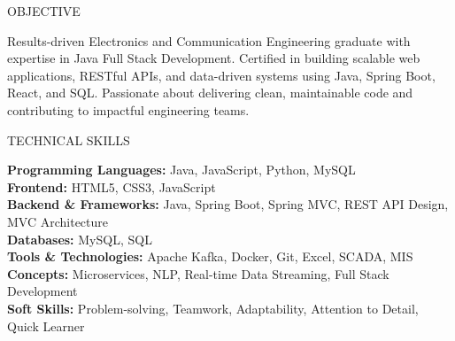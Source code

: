 \documentclass{resume}
\begin{document}

\begin{rSection}{OBJECTIVE}

Results-driven Electronics and Communication Engineering graduate with expertise in Java Full Stack Development. Certified in building scalable web applications, RESTful APIs, and data-driven systems using Java, Spring Boot, React, and SQL. Passionate about delivering clean, maintainable code and contributing to impactful engineering teams.

\end{rSection}


\begin{rSection}{TECHNICAL SKILLS}

\textbf{Programming Languages:} Java, JavaScript, Python, MySQL \\
\textbf{Frontend:} HTML5, CSS3, JavaScript \\
\textbf{Backend \& Frameworks:} Java, Spring Boot, Spring MVC, REST API Design, MVC Architecture \\
\textbf{Databases:} MySQL, SQL \\
\textbf{Tools \& Technologies:} Apache Kafka, Docker, Git, Excel, SCADA, MIS \\
\textbf{Concepts:} Microservices, NLP, Real-time Data Streaming, Full Stack Development \\
\textbf{Soft Skills:} Problem-solving, Teamwork, Adaptability, Attention to Detail, Quick Learner

\end{rSection}

\end{document}
